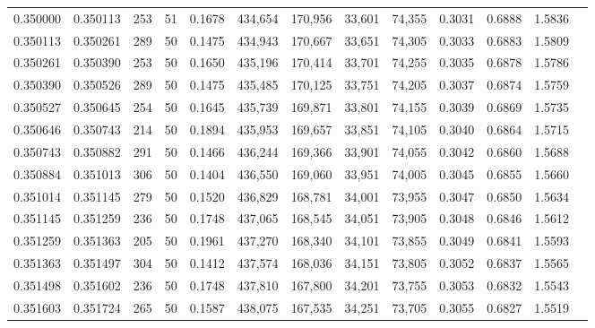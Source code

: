 \begin{tabular}{rrrrrrrrrrrrr}
0.350000 & 0.350113 &   253 &  51 &                                     0.1678 & 434,654 & 170,956 &  33,601 &  74,355 & 0.3031 & 0.6888 & 1.5836 \\
0.350113 & 0.350261 &   289 &  50 &                                     0.1475 & 434,943 & 170,667 &  33,651 &  74,305 & 0.3033 & 0.6883 & 1.5809 \\
0.350261 & 0.350390 &   253 &  50 &                                     0.1650 & 435,196 & 170,414 &  33,701 &  74,255 & 0.3035 & 0.6878 & 1.5786 \\
0.350390 & 0.350526 &   289 &  50 &                                     0.1475 & 435,485 & 170,125 &  33,751 &  74,205 & 0.3037 & 0.6874 & 1.5759 \\
0.350527 & 0.350645 &   254 &  50 &                                     0.1645 & 435,739 & 169,871 &  33,801 &  74,155 & 0.3039 & 0.6869 & 1.5735 \\
0.350646 & 0.350743 &   214 &  50 &                                     0.1894 & 435,953 & 169,657 &  33,851 &  74,105 & 0.3040 & 0.6864 & 1.5715 \\
0.350743 & 0.350882 &   291 &  50 &                                     0.1466 & 436,244 & 169,366 &  33,901 &  74,055 & 0.3042 & 0.6860 & 1.5688 \\
0.350884 & 0.351013 &   306 &  50 &                                     0.1404 & 436,550 & 169,060 &  33,951 &  74,005 & 0.3045 & 0.6855 & 1.5660 \\
0.351014 & 0.351145 &   279 &  50 &                                     0.1520 & 436,829 & 168,781 &  34,001 &  73,955 & 0.3047 & 0.6850 & 1.5634 \\
0.351145 & 0.351259 &   236 &  50 &                                     0.1748 & 437,065 & 168,545 &  34,051 &  73,905 & 0.3048 & 0.6846 & 1.5612 \\
0.351259 & 0.351363 &   205 &  50 &                                     0.1961 & 437,270 & 168,340 &  34,101 &  73,855 & 0.3049 & 0.6841 & 1.5593 \\
0.351363 & 0.351497 &   304 &  50 &                                     0.1412 & 437,574 & 168,036 &  34,151 &  73,805 & 0.3052 & 0.6837 & 1.5565 \\
0.351498 & 0.351602 &   236 &  50 &                                     0.1748 & 437,810 & 167,800 &  34,201 &  73,755 & 0.3053 & 0.6832 & 1.5543 \\
0.351603 & 0.351724 &   265 &  50 &                                     0.1587 & 438,075 & 167,535 &  34,251 &  73,705 & 0.3055 & 0.6827 & 1.5519 \\

\end{tabular}
